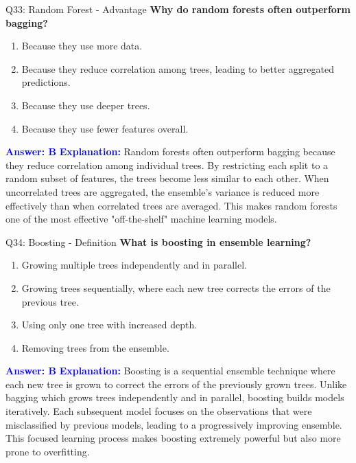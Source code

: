 \documentclass[8pt]{beamer}
\begin{document}
	\begin{frame}{Q33: Random Forest - Advantage}
		\fontsize{6.5}{7.5}\selectfont
		\textbf{Why do random forests often outperform bagging?}
		\begin{enumerate}
			\item Because they use more data.
			\item Because they reduce correlation among trees, leading to better aggregated predictions.
			\item Because they use deeper trees.
			\item Because they use fewer features overall.
		\end{enumerate}
		\vspace{0.1cm}
		\textcolor{blue}{\textbf{Answer: B}}
		\vspace{0.1cm}
		\textcolor{blue}{\textbf{Explanation:}} Random forests often outperform bagging because they reduce correlation among individual trees. By restricting each split to a random subset of features, the trees become less similar to each other. When uncorrelated trees are aggregated, the ensemble's variance is reduced more effectively than when correlated trees are averaged. This makes random forests one of the most effective "off-the-shelf" machine learning models.
	\end{frame}
	
	\begin{frame}{Q34: Boosting - Definition}
		\fontsize{6.5}{7.5}\selectfont
		\textbf{What is boosting in ensemble learning?}
		\begin{enumerate}
			\item Growing multiple trees independently and in parallel.
			\item Growing trees sequentially, where each new tree corrects the errors of the previous tree.
			\item Using only one tree with increased depth.
			\item Removing trees from the ensemble.
		\end{enumerate}
		\vspace{0.1cm}
		\textcolor{blue}{\textbf{Answer: B}}
		\vspace{0.1cm}
		\textcolor{blue}{\textbf{Explanation:}} Boosting is a sequential ensemble technique where each new tree is grown to correct the errors of the previously grown trees. Unlike bagging which grows trees independently and in parallel, boosting builds models iteratively. Each subsequent model focuses on the observations that were misclassified by previous models, leading to a progressively improving ensemble. This focused learning process makes boosting extremely powerful but also more prone to overfitting.
	\end{frame}
	
\end{document}
